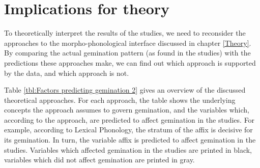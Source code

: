\section{Implications for theory}


To theoretically interpret the results of the studies, we need to reconsider the approaches to the morpho-phonological interface discussed in chapter \ref{Theory}.   By comparing the actual gemination pattern (as found in the studies) with the predictions these approaches make, we can find out which approach is supported by the data, and which approach is not.



Table \ref{tbl:Factors predicting gemination 2} gives an overview of the discussed theoretical approaches. For each approach, the table shows the underlying concepts the approach assumes to govern gemination, and the variables which, according to the approach, are predicted to affect gemination in the studies. For example, according to Lexical Phonology, the stratum of the affix is decisive for its gemination. In turn, the variable affix is predicted to affect gemination in the studies. 
Variables which affected gemination in the studies are printed in black, variables which did not affect gemination are printed in gray.






